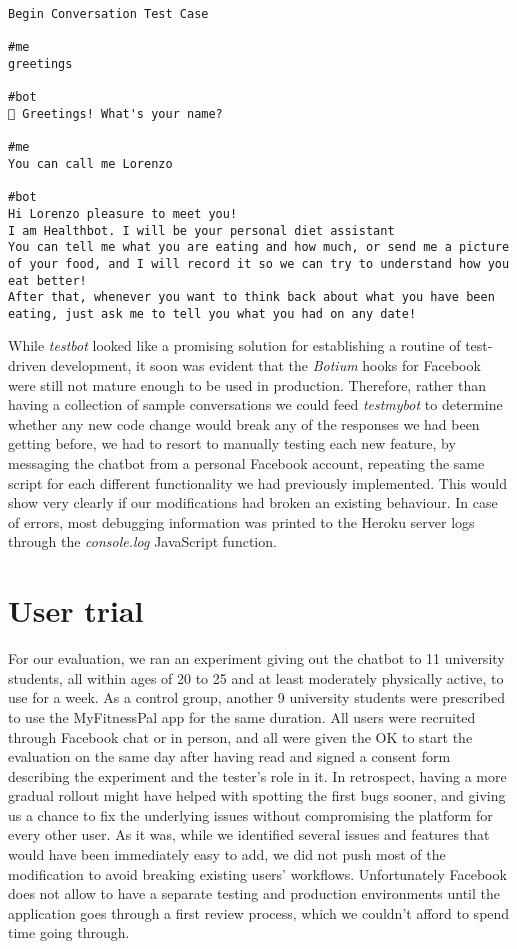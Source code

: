\begin{lstlisting}
Begin Conversation Test Case

#me
greetings

#bot
👋 Greetings! What's your name?

#me
You can call me Lorenzo

#bot
Hi Lorenzo pleasure to meet you!
I am Healthbot. I will be your personal diet assistant
You can tell me what you are eating and how much, or send me a picture of your food, and I will record it so we can try to understand how you eat better!
After that, whenever you want to think back about what you have been eating, just ask me to tell you what you had on any date!
\end{lstlisting}
While \textit{testbot}  looked like a promising solution for establishing a routine of test-driven development, it soon was evident that the \textit{Botium} hooks for Facebook were still not mature enough to be used in production. Therefore, rather than having a collection of sample conversations we could feed \textit{testmybot} to determine whether any new code change would break any of the responses we had been getting before, we had to resort to manually testing each new feature, by messaging the chatbot from a personal Facebook account, repeating the same script for each different functionality we had previously implemented. This would show very clearly if our modifications had broken an existing behaviour. In case of errors, most debugging information was printed to the Heroku server logs through the \textit{console.log} JavaScript function.

\section{User trial}
For our evaluation, we ran an experiment giving out the chatbot to 11 university students, all within ages of 20 to 25 and at least moderately physically active, to use for a week. As a control group, another 9 university students were prescribed to use the MyFitnessPal app for the same duration. All users were recruited through Facebook chat or in person, and all were given the OK to start the evaluation on the same day after having read and signed a consent form describing the experiment and the tester's role in it. In retrospect, having a more gradual rollout might have helped with spotting the first bugs sooner, and giving us a chance to fix the underlying issues without compromising the platform for every other user. As it was, while we identified several issues and features that would have been immediately easy to add, we did not push most of the modification to avoid breaking existing users' workflows. Unfortunately Facebook does not allow to have a separate testing and production environments until the application goes through a first review process, which we couldn't afford to spend time going through.
